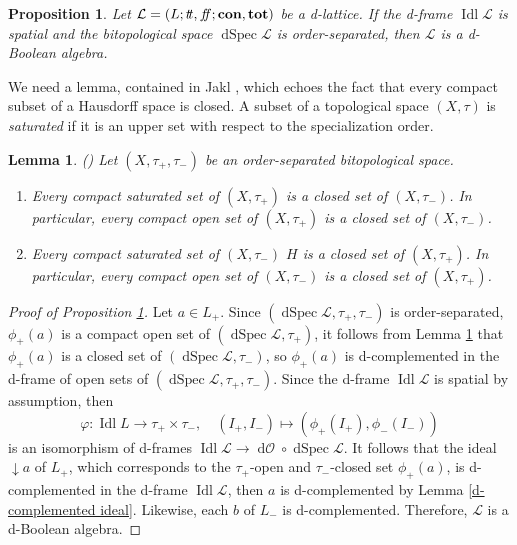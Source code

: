 \documentclass[11pt]{article}
\DeclareMathOperator{\idl}{Idl}
\DeclareMathOperator{\dSpec}{dSpec}
\DeclareMathOperator{\dO}{d\mathcal{O}}
\theoremstyle{plain}
\newtheorem{lem}[thm]{Lemma}
\newtheorem{prop}[thm]{Proposition}
\theoremstyle{definition}
\newcommand{\dbt}{{t\!t}}
\newcommand{\dbf}{{f\!\!f}}
\newcommand{\lra}{\longrightarrow}
\begin{document}
\begin{prop}\label{d-Boolean and order-separated}
Let $\mathcal{L}=(L;\dbt,\dbf;{\bf con},{\bf tot})$ be a d-lattice. If the d-frame $\idl \mathcal{L}$ is  spatial and the bitopological space $\dSpec\mathcal{L}$ is order-separated, then $\mathcal{L}$ is a d-Boolean algebra.
\end{prop}

We need a lemma,  contained in Jakl \cite[Lemma 4.1.29]{Jakl},  which echoes the fact that every compact subset of a Hausdorff space is closed. A subset of a topological space $(X,\tau)$ is \emph{saturated} \cite{Gierz2003} if it is an upper set with respect to the specialization order. 

\begin{lem}\label{compact opens and dclopens} {\rm (\cite{Jakl})} Let $(X,\tau_+,\tau_-)$ be an order-separated bitopological space. \begin{enumerate}[label=\rm(\roman*)] \setlength{\itemsep}{0pt} \item Every compact saturated set of $(X,\tau_+)$ is a closed set of $(X,\tau_-)$. In particular, every compact open set of $(X,\tau_+)$ is a closed set of $(X,\tau_-)$. 
\item  Every compact saturated set of $(X,\tau_-)$  $H$ is a closed set of $(X,\tau_+)$. In particular, every compact open set of $(X,\tau_-)$ is a closed set of $(X,\tau_+)$. \end{enumerate} \end{lem}  
 
\begin{proof}[Proof of Proposition \ref{d-Boolean and order-separated}] Let $a\in L_+$. Since $(\dSpec\mathcal{L},\tau_+,\tau_-)$ is order-separated, $\phi_+(a)$ is a compact open set of $(\dSpec\mathcal{L},\tau_+)$, it follows from Lemma \ref{compact opens and dclopens} that $\phi_+(a)$ is a closed set of $(\dSpec\mathcal{L},\tau_-)$, so $\phi_+(a)$ is d-complemented in the d-frame  of open sets of $(\dSpec\mathcal{L},\tau_+,\tau_-)$. Since the d-frame $\idl\mathcal{L}$  is spatial by assumption, then   $$\varphi\colon \idl L\lra \tau_+\times \tau_-, \quad (I_+,I_-)\mapsto (\phi_+(I_+), \phi_-(I_-)) $$  is   an isomorphism of d-frames $\idl\mathcal{L}\lra \dO\circ\dSpec\mathcal{L}$. It follows that the  ideal $\downarrow\!a$ of $L_+$, which corresponds to the $\tau_+$-open and $\tau_-$-closed set $\phi_+(a)$, is d-complemented in the d-frame $\idl\mathcal{L}$, then $a$ is d-complemented by Lemma \ref{d-complemented ideal}. Likewise, each $b$ of $L_-$ is d-complemented. Therefore, $\mathcal{L}$ is a d-Boolean algebra.
\end{proof}
 
\end{document}
